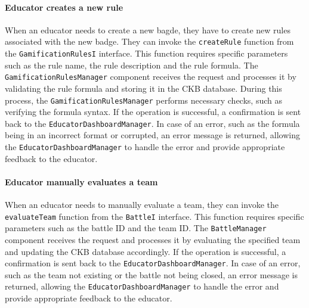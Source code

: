 \paragraph{Educator creates a new rule}
When an educator needs to create a new bagde, they have to create new rules associated with the new badge. They can invoke the \verb|createRule| function from the \verb|GamificationRulesI| interface.
This function requires specific parameters such as the rule name, the rule description and the rule formula. The \verb|GamificationRulesManager| component receives the request and processes it by validating the rule formula and storing it in the CKB database.
During this process, the \verb|GamificationRulesManager| performs necessary checks, such as verifying the formula syntax. If the operation is successful, a confirmation is sent back to the \verb|EducatorDashboardManager|.
In case of an error, such as the formula being in an incorrect format or corrupted, an error message is returned, allowing the \verb|EducatorDashboardManager| to handle the error and provide appropriate feedback to the educator.

\paragraph{Educator manually evaluates a team}
When an educator needs to manually evaluate a team, they can invoke the \verb|evaluateTeam| function from the \verb|BattleI| interface. This function requires specific parameters such as the battle ID and the team ID.
The \verb|BattleManager| component receives the request and processes it by evaluating the specified team and updating the CKB database accordingly. If the operation is successful, a confirmation is sent back to the \verb|EducatorDashboardManager|.
In case of an error, such as the team not existing or the battle not being closed, an error message is returned, allowing the \verb|EducatorDashboardManager| to handle the error and provide appropriate feedback to the educator.

